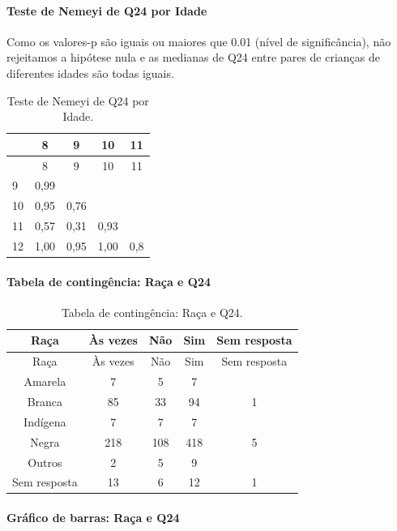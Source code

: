 \documentclass[]{article}
\let\oldparagraph\paragraph
\renewcommand{\paragraph}[1]{\oldparagraph{#1}\mbox{}}
\begin{document}
\hypertarget{teste-de-nemeyi-de-q24-por-idade}{%
\paragraph{Teste de Nemeyi de Q24 por Idade}\label{teste-de-nemeyi-de-q24-por-idade}}

Como os valores-p são iguais ou maiores que 0.01 (nível de significância), não rejeitamos a hipótese nula e as medianas de Q24 entre pares de crianças de diferentes idades são todas iguais.

\begin{longtable}[]{@{}lcccc@{}}
\caption{\label{tab:unnamed-chunk-632}Teste de Nemeyi de Q24 por Idade.}\tabularnewline
\toprule
& 8 & 9 & 10 & 11\tabularnewline
\midrule
\endfirsthead
\toprule
& 8 & 9 & 10 & 11\tabularnewline
\midrule
\endhead
9 & 0,99 & & &\tabularnewline
10 & 0,95 & 0,76 & &\tabularnewline
11 & 0,57 & 0,31 & 0,93 &\tabularnewline
12 & 1,00 & 0,95 & 1,00 & 0,8\tabularnewline
\bottomrule
\end{longtable}

\cleardoublepage

\hypertarget{tabela-de-continguxeancia-rauxe7a-e-q24}{%
\paragraph{Tabela de contingência: Raça e Q24}\label{tabela-de-continguxeancia-rauxe7a-e-q24}}

\begin{longtable}[]{@{}ccccc@{}}
\caption{\label{tab:unnamed-chunk-633}Tabela de contingência: Raça e Q24.}\tabularnewline
\toprule
Raça & Às vezes & Não & Sim & Sem resposta\tabularnewline
\midrule
\endfirsthead
\toprule
Raça & Às vezes & Não & Sim & Sem resposta\tabularnewline
\midrule
\endhead
Amarela & 7 & 5 & 7 &\tabularnewline
Branca & 85 & 33 & 94 & 1\tabularnewline
Indígena & 7 & 7 & 7 &\tabularnewline
Negra & 218 & 108 & 418 & 5\tabularnewline
Outros & 2 & 5 & 9 &\tabularnewline
Sem resposta & 13 & 6 & 12 & 1\tabularnewline
\bottomrule
\end{longtable}

\hypertarget{gruxe1fico-de-barras-rauxe7a-e-q24}{%
\paragraph{Gráfico de barras: Raça e Q24}\label{gruxe1fico-de-barras-rauxe7a-e-q24}}
\end{document}
